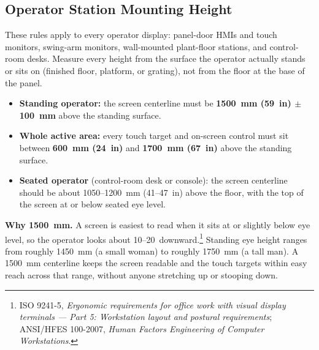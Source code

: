 
\subsection{Operator Station Mounting Height}\label{sec:hmi-height}
These rules apply to every operator display: panel-door HMIs and touch monitors, swing-arm monitors, wall-mounted plant-floor stations, and control-room desks. Measure every height from the surface the operator actually stands or sits on (finished floor, platform, or grating), not from the floor at the base of the panel.

\begin{itemize}[itemsep=2pt]
  \item \textbf{Standing operator:} the screen centerline must be \textbf{1500~mm (59~in) $\pm$100~mm} above the standing surface.
  \item \textbf{Whole active area:} every touch target and on-screen control must sit between \textbf{600~mm (24~in)} and \textbf{1700~mm (67~in)} above the standing surface.
  \item \textbf{Seated operator} (control-room desk or console): the screen centerline should be about 1050--1200~mm (41--47~in) above the floor, with the top of the screen at or below seated eye level.
\end{itemize}

\textbf{Why 1500~mm.} A screen is easiest to read when it sits at or slightly below eye level, so the operator looks about 10--20\textdegree\ downward.\footnote{ISO 9241-5, \emph{Ergonomic requirements for office work with visual display terminals --- Part 5: Workstation layout and postural requirements}; ANSI/HFES 100-2007, \emph{Human Factors Engineering of Computer Workstations}.} Standing eye height ranges from roughly 1450~mm (a small woman) to roughly 1750~mm (a tall man). A 1500~mm centerline keeps the screen readable and the touch targets within easy reach across that range, without anyone stretching up or stooping down.

